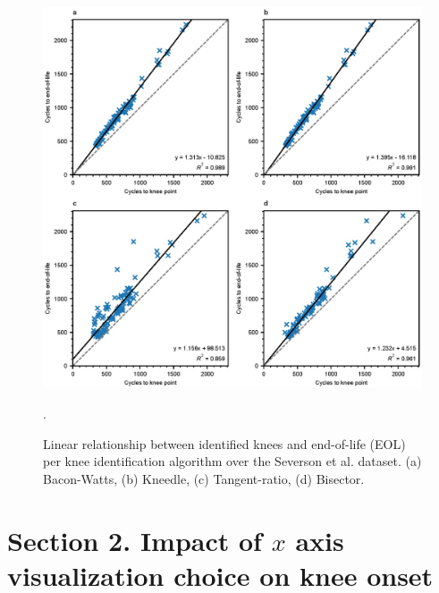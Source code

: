 \documentclass[journal=jpclcd,manuscript=article]{achemso}
\begin{document}
\begin{figure}[ht]
\centering
\includegraphics[scale=1.0]{figures/severson_knee_eol_all_algorithms.eps}
  \label{fig:kneepoint2EOL}
\caption{Linear relationship between identified knees and end-of-life (EOL) per knee identification algorithm over the Severson et al. \cite{severson_data-driven_2019} dataset. (a) Bacon-Watts\cite{fermin-cueto_identification_2020}, (b) Kneedle\cite{satopaa_finding_2011}, (c) Tangent-ratio\cite{diao_algorithm_2019}, (d) Bisector\cite{greenbank_automated_nodate}.
}.
\label{fig:severson_knee_eol_all_algorithms}
\end{figure}


\section{Section 2. Impact of $x$ axis visualization choice on knee onset}
\end{document}
